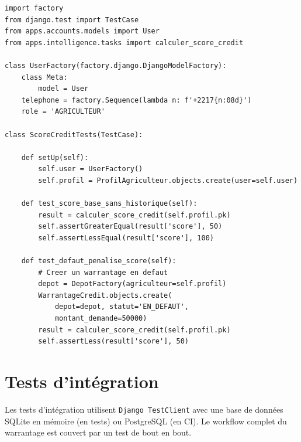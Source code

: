 \documentclass[12pt,a4paper,twoside]{report}
\begin{document}
\begin{lstlisting}[style=pythonstyle, caption={Tests du score de crédit avec factory-boy}]
import factory
from django.test import TestCase
from apps.accounts.models import User
from apps.intelligence.tasks import calculer_score_credit

class UserFactory(factory.django.DjangoModelFactory):
    class Meta:
        model = User
    telephone = factory.Sequence(lambda n: f'+2217{n:08d}')
    role = 'AGRICULTEUR'

class ScoreCreditTests(TestCase):

    def setUp(self):
        self.user = UserFactory()
        self.profil = ProfilAgriculteur.objects.create(user=self.user)

    def test_score_base_sans_historique(self):
        result = calculer_score_credit(self.profil.pk)
        self.assertGreaterEqual(result['score'], 50)
        self.assertLessEqual(result['score'], 100)

    def test_defaut_penalise_score(self):
        # Creer un warrantage en defaut
        depot = DepotFactory(agriculteur=self.profil)
        WarrantageCredit.objects.create(
            depot=depot, statut='EN_DEFAUT',
            montant_demande=50000)
        result = calculer_score_credit(self.profil.pk)
        self.assertLess(result['score'], 50)
\end{lstlisting}

\section{Tests d'intégration}

Les tests d'intégration utilisent \texttt{Django TestClient} avec une
base de données SQLite en mémoire (en tests) ou PostgreSQL (en CI).
Le workflow complet du warrantage est couvert par un test de bout en bout.
\end{document}
